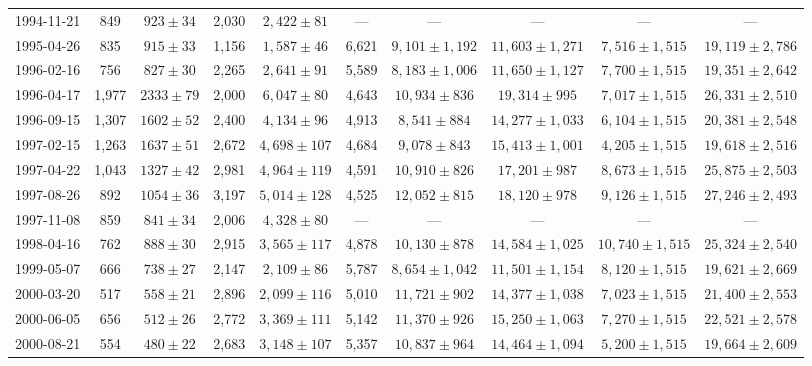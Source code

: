 \begin{landscape}
\begin{longtable}{cccccccccc}
{1994-11-21} & 849 & {$923  \pm  34$} & 2,030 & {$2,422 \pm 81$} & --- & --- & --- & --- & --- \\
{1995-04-26} & 835 & {$915  \pm  33$} & 1,156 & {$1,587 \pm 46$} & 6,621 & {$9,101 \pm 1,192$} & {$11,603 \pm 1,271$} & {$7,516 \pm 1,515$} & {$19,119 \pm 2,786$} \\
{1996-02-16} & 756 & {$827  \pm  30$} & 2,265 & {$2,641 \pm 91$} & 5,589 & {$8,183 \pm 1,006$} & {$11,650 \pm 1,127$} & {$7,700 \pm 1,515$} & {$19,351 \pm 2,642$} \\
{1996-04-17} & 1,977 & {$2333  \pm  79$} & 2,000 & {$6,047 \pm 80$} & 4,643 & {$10,934 \pm 836$} & {$19,314 \pm 995$} & {$7,017 \pm 1,515$} & {$26,331 \pm 2,510$} \\
{1996-09-15} & 1,307 & {$1602  \pm  52$} & 2,400 & {$4,134 \pm 96$} & 4,913 & {$8,541 \pm 884$} & {$14,277 \pm 1,033$} & {$6,104 \pm 1,515$} & {$20,381 \pm 2,548$} \\
{1997-02-15} & 1,263 & {$1637  \pm  51$} & 2,672 & {$4,698 \pm 107$} & 4,684 & {$9,078 \pm 843$} & {$15,413 \pm 1,001$} & {$4,205 \pm 1,515$} & {$19,618 \pm 2,516$} \\
{1997-04-22} & 1,043 & {$1327  \pm  42$} & 2,981 & {$4,964 \pm 119$} & 4,591 & {$10,910 \pm 826$} & {$17,201 \pm 987$} & {$8,673 \pm 1,515$} & {$25,875 \pm 2,503$} \\
{1997-08-26} & 892 & {$1054  \pm  36$} & 3,197 & {$5,014 \pm 128$} & 4,525 & {$12,052 \pm 815$} & {$18,120 \pm 978$} & {$9,126 \pm 1,515$} & {$27,246 \pm 2,493$} \\
{1997-11-08} & 859 & {$841  \pm  34$} & 2,006 & {$4,328 \pm 80$} & --- & --- & --- & --- & --- \\
{1998-04-16} & 762 & {$888  \pm  30$} & 2,915 & {$3,565 \pm 117$} & 4,878 & {$10,130 \pm 878$} & {$14,584 \pm 1,025$} & {$10,740 \pm 1,515$} & {$25,324 \pm 2,540$} \\
{1999-05-07} & 666 & {$738  \pm  27$} & 2,147 & {$2,109 \pm 86$} & 5,787 & {$8,654 \pm 1,042$} & {$11,501 \pm 1,154$} & {$8,120 \pm 1,515$} & {$19,621 \pm 2,669$} \\
{2000-03-20} & 517 & {$558  \pm  21$} & 2,896 & {$2,099 \pm 116$} & 5,010 & {$11,721 \pm 902$} & {$14,377 \pm 1,038$} & {$7,023 \pm 1,515$} & {$21,400 \pm 2,553$} \\
{2000-06-05} & 656 & {$512  \pm  26$} & 2,772 & {$3,369 \pm 111$} & 5,142 & {$11,370 \pm 926$} & {$15,250 \pm 1,063$} & {$7,270 \pm 1,515$} & {$22,521 \pm 2,578$} \\
{2000-08-21} & 554 & {$480  \pm  22$} & 2,683 & {$3,148 \pm 107$} & 5,357 & {$10,837 \pm 964$} & {$14,464 \pm 1,094$} & {$5,200 \pm 1,515$} & {$19,664 \pm 2,609$} \\

\end{longtable}
\end{landscape}
